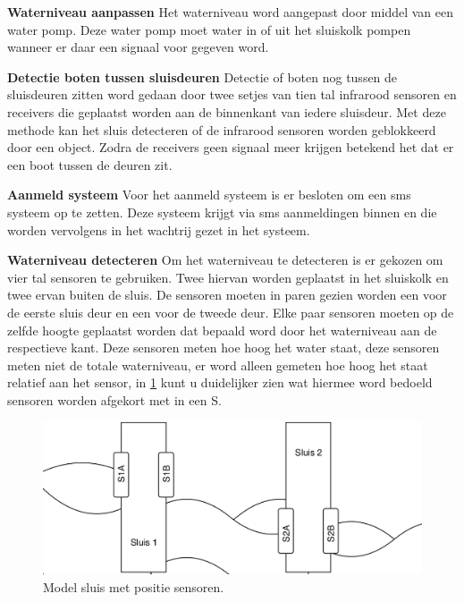 \documentclass{article}
\begin{document}
\noindent\textbf{Waterniveau aanpassen}\newline
Het waterniveau word aangepast door middel van een water pomp. Deze water pomp moet water in of uit het sluiskolk pompen wanneer er daar een signaal voor gegeven word.\newline

\noindent\textbf{Detectie boten tussen sluisdeuren}\newline
Detectie of boten nog tussen de sluisdeuren zitten word gedaan door twee setjes van tien tal infrarood sensoren en receivers die geplaatst worden aan de binnenkant van iedere sluisdeur. Met deze methode kan het sluis detecteren of de infrarood sensoren worden geblokkeerd door een object. Zodra de receivers geen signaal meer krijgen betekend het dat er een boot tussen de deuren zit.\newline

\noindent\textbf{Aanmeld systeem}\newline
Voor het aanmeld systeem is er besloten om een sms systeem op te zetten. Deze systeem krijgt via sms aanmeldingen binnen en die worden vervolgens in het wachtrij gezet in het systeem. \newline

\noindent\textbf{Waterniveau detecteren}\newline
\newline Om het waterniveau te detecteren is er gekozen om vier tal sensoren te gebruiken. Twee hiervan worden geplaatst in het sluiskolk en twee ervan buiten de sluis. De sensoren moeten in paren gezien worden een voor de eerste sluis deur en een voor de tweede deur. Elke paar sensoren moeten op de zelfde hoogte geplaatst worden dat bepaald word door het waterniveau aan de respectieve kant. Deze sensoren meten hoe hoog het water staat, deze sensoren meten niet de totale waterniveau, er word alleen gemeten hoe hoog het staat relatief aan het sensor, in \ref{fig:sluiceSensoren} kunt u duidelijker zien wat hiermee word bedoeld sensoren worden afgekort met in een S.
\begin{figure}[!h]
	\centering
	\includegraphics[width=\textwidth]{images/sluis_sensoren.png}
    \caption{Model sluis met positie sensoren.}
	\label{fig:sluiceSensoren}
\end{figure} \newpage
\end{document}
